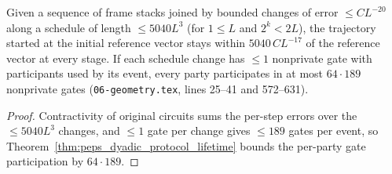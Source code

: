 \begin{lemma}
    \label{thm:peps_protocol_bounded_trajectory}
    \leanok
    Given a sequence of frame stacks joined by bounded changes of error $\le CL^{-20}$ along a schedule of length $\le 5040L^3$ (for $1\le L$ and $2^k<2L$), the trajectory started at the initial reference vector stays within $5040\,CL^{-17}$ of the reference vector at every stage. If each schedule change has $\le1$ nonprivate gate with participants used by its event, every party participates in at most $64\cdot189$ nonprivate gates (\texttt{06-geometry.tex}, lines 25--41 and 572--631).
\end{lemma}

\begin{proof}\leanok
    Contractivity of original circuits sums the per-step errors over the $\le5040L^3$ changes, and $\le1$ gate per change gives $\le189$ gates per event, so Theorem~\ref{thm:peps_dyadic_protocol_lifetime} bounds the per-party gate participation by $64\cdot189$.
\end{proof}

